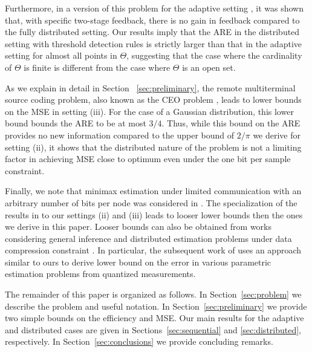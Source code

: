 Furthermore, in a version of this problem for the adaptive setting \cite{5751320}, it was shown that, with specific two-stage feedback, there is no gain in feedback compared to the fully distributed setting. Our results imply that the ARE in the distributed setting with threshold detection rules is strictly larger than that in the adaptive setting for almost all points in $\Theta$, suggesting that the case where the cardinality of $\Theta$ is finite is different from the case where $\Theta$ is an open set.\par
%
As we explain in detail in Section~ \ref{sec:preliminary}, the remote multiterminal source coding problem, also known as the CEO problem \cite{berger1996ceo, viswanathan1997quadratic, oohama1998rate, prabhakaran2004rate}, leads to lower bounds on the MSE in setting (iii). For the case of a Gaussian distribution, this lower bound bounds the ARE to be at most $3/4$. Thus, while this bound on the ARE provides no new information compared to the upper bound of $2/\pi$ we derive for setting (ii), it shows that the distributed nature of the problem is not a limiting factor in achieving MSE close to optimum even under the one bit per sample constraint. 
 \par
% 
Finally, we note that minimax estimation under limited communication with an arbitrary number of bits per node was considered in 
\cite{zhang2013information, duchi2014optimality}. The specialization of the results in \cite{zhang2013information, duchi2014optimality} to our settings (ii) and (iii) leads to looser lower bounds then the ones we derive in this paper. Looser bounds can also be obtained from works considering general inference and distributed estimation problems under data compression constraint \cite{DBLP:journals/corr/abs-1802-08417, zhang1988estimation, han2018distributed, xu2017information, Barnes2018}. In particular, the subsequent work of \cite{Barnes2018} uses an approach similar to ours to derive lower bound on the error in various parametric estimation problems from quantized measurements. \par


The remainder of this paper is organized as follows. In Section~\ref{sec:problem} we describe the problem and useful notation. In Section~\ref{sec:preliminary} we provide two simple bounds on the efficiency and MSE. Our main results for the adaptive and distributed cases are given in Sections~\ref{sec:sequential} and \ref{sec:distributed}, respectively. In Section~\ref{sec:conclusions} we provide concluding remarks. 

